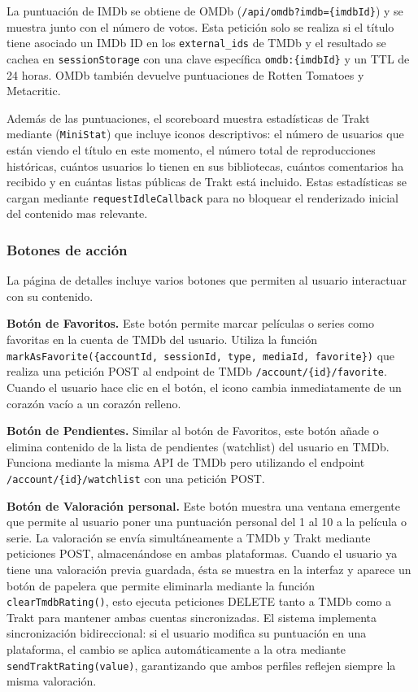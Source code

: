 La puntuación de IMDb se obtiene de OMDb (\texttt{/api/omdb?imdb=\{imdbId\}}) y se muestra junto con el número de votos. Esta petición solo se realiza si el título tiene asociado un IMDb ID en los \texttt{external\_ids} de TMDb y el resultado se cachea en \texttt{sessionStorage} con una clave específica \texttt{omdb:\{imdbId\}} y un TTL de 24 horas. OMDb también devuelve puntuaciones de Rotten Tomatoes y Metacritic.

Además de las puntuaciones, el scoreboard muestra estadísticas de Trakt mediante (\texttt{MiniStat}) que incluye iconos descriptivos: el número de usuarios que están viendo el título en este momento, el número total de reproducciones históricas, cuántos usuarios lo tienen en sus bibliotecas, cuántos comentarios ha recibido y en cuántas listas públicas de Trakt está incluido. Estas estadísticas se cargan mediante \texttt{requestIdleCallback} para no bloquear el renderizado inicial del contenido mas relevante.

\subsubsection{Botones de acción}

La página de detalles incluye varios botones que permiten al usuario interactuar con su contenido.

\textbf{Botón de Favoritos.} Este botón permite marcar películas o series como favoritas en la cuenta de TMDb del usuario. Utiliza la función \texttt{markAsFavorite(\{accountId, sessionId, type, mediaId, favorite\})} que realiza una petición POST al endpoint de TMDb \texttt{/account/\{id\}/favorite}. Cuando el usuario hace clic en el botón, el icono cambia inmediatamente de un corazón vacío a un corazón relleno.

\textbf{Botón de Pendientes.} Similar al botón de Favoritos, este botón añade o elimina contenido de la lista de pendientes (watchlist) del usuario en TMDb. Funciona mediante la misma API de TMDb pero utilizando el endpoint \texttt{/account/\{id\}/watchlist} con una petición POST.

\textbf{Botón de Valoración personal.} Este botón muestra una ventana emergente que permite al usuario poner una puntuación personal del 1 al 10 a la película o serie. La valoración se envía simultáneamente a TMDb y Trakt mediante peticiones POST, almacenándose en ambas plataformas. Cuando el usuario ya tiene una valoración previa guardada, ésta se muestra en la interfaz y aparece un botón de papelera que permite eliminarla mediante la función \texttt{clearTmdbRating()}, esto ejecuta peticiones DELETE tanto a TMDb como a Trakt para mantener ambas cuentas sincronizadas. El sistema implementa sincronización bidireccional: si el usuario modifica su puntuación en una plataforma, el cambio se aplica automáticamente a la otra mediante \texttt{sendTraktRating(value)}, garantizando que ambos perfiles reflejen siempre la misma valoración.

